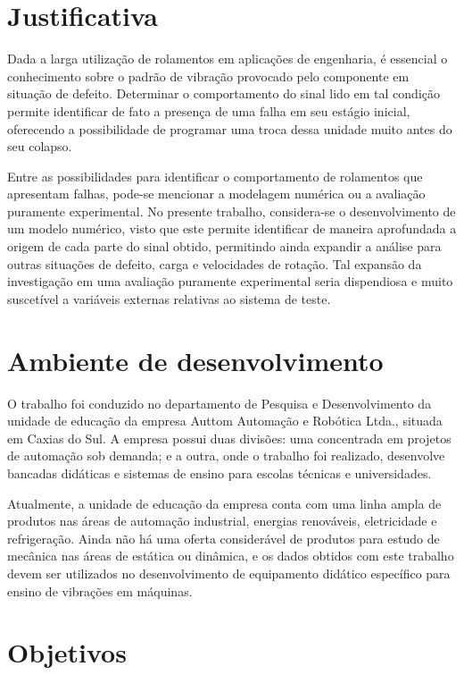 \documentclass[12pt,oneside,english,brazil,lmodern,siglas,simbolos,cite=num]{ucsmonograph}
\begin{document}
	\section{Justificativa}\label{sec:justificativa}
	Dada a larga utilização de rolamentos em aplicações de engenharia, é essencial o conhecimento sobre o padrão de vibração provocado pelo componente em situação de defeito.
	Determinar o comportamento do sinal lido em tal condição permite identificar de fato a presença de uma falha em seu estágio inicial, oferecendo a possibilidade de programar uma troca dessa unidade muito antes do seu colapso.
	
	Entre as possibilidades para identificar o comportamento de rolamentos que apresentam falhas, pode-se mencionar a modelagem numérica ou a avaliação puramente experimental.
	No presente trabalho, considera-se o desenvolvimento de um modelo numérico, visto que este permite identificar de maneira aprofundada a origem de cada parte do sinal obtido, permitindo ainda expandir a análise para outras situações de defeito, carga e velocidades de rotação.
	Tal expansão da investigação em uma avaliação puramente experimental seria dispendiosa e muito suscetível a variáveis externas relativas ao sistema de teste.
	
	\section{Ambiente de desenvolvimento}	
	O trabalho foi conduzido no departamento de Pesquisa e Desenvolvimento da unidade de educação da empresa Auttom Automação e Robótica Ltda., situada em Caxias do Sul.
	A empresa possui duas divisões: uma concentrada em projetos de automação sob demanda; e a outra, onde o trabalho foi realizado, desenvolve bancadas didáticas e sistemas de ensino para escolas técnicas e universidades.
	
	Atualmente, a unidade de educação da empresa conta com uma linha ampla de produtos nas áreas de automação industrial, energias renováveis, eletricidade e refrigeração.
	Ainda não há uma oferta considerável de produtos para estudo de mecânica nas áreas de estática ou dinâmica, e os dados obtidos com este trabalho devem ser utilizados no desenvolvimento de equipamento didático específico para ensino de vibrações em máquinas.
	
	\section{Objetivos}
	
\end{document}
